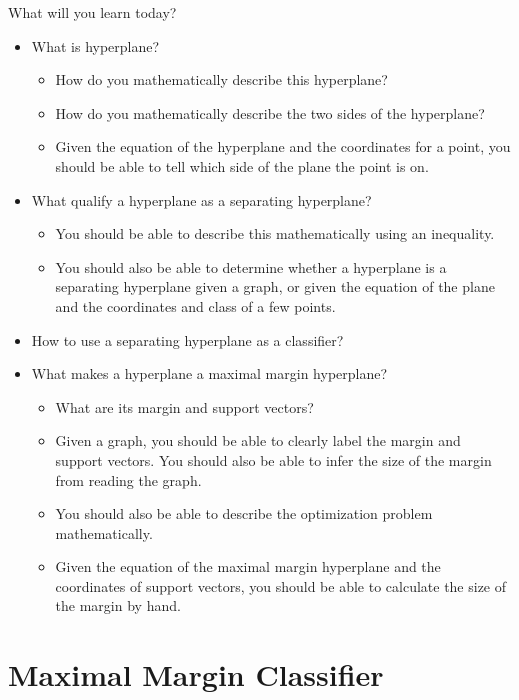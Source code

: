 \documentclass[aspectratio=169,usenames,dvipsnames]{beamer}
\begin{document}
\begin{frame}[c]{What will you learn today?}

\begin{itemize}
\item What is hyperplane?
	\begin{itemize}
	\item How do you mathematically describe this hyperplane?
	\item How do you mathematically describe the two sides of the hyperplane?
	\item Given the equation of the hyperplane and the coordinates for a point, you should be able to tell which side of the plane the point is on.
	\end{itemize}
\item What qualify a hyperplane as a separating hyperplane?
	\begin{itemize}
	\item You should be able to describe this mathematically using an inequality.
	\item You should also be able to determine whether a hyperplane is a separating hyperplane given a graph, or given the equation of the plane and the coordinates and class of a few points.
	\end{itemize}
\item How to use a separating hyperplane as a classifier?
\item What makes a hyperplane a maximal margin hyperplane?
	\begin{itemize}
	\item What are its margin and support vectors?
	\item Given a graph, you should be able to clearly label the margin and support vectors. You should also be able to infer the size of the margin from reading the graph.
	\item You should also be able to describe the optimization problem mathematically.
	\item Given the equation of the maximal margin hyperplane and the coordinates of support vectors, you should be able to calculate the size of the margin by hand.
	\end{itemize}
\end{itemize}

\end{frame}


\section{Maximal Margin Classifier}
\end{document}
